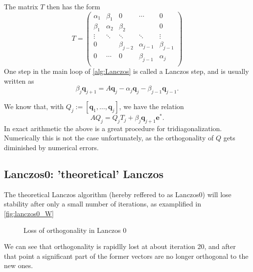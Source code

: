 \documentclass{article}
\begin{document}
	The matrix $T$ then has the form 
	$$T=\begin{pmatrix}
		\alpha_1&\beta_1&0&\cdots&0\\
		\beta_1&\alpha_2&\beta_2&&0\\
		\vdots&\ddots&\ddots&\ddots&\vdots\\
		0&&\beta_{j-2}&\alpha_{j-1}&\beta_{j-1}\\
		0&\cdots&0&\beta_{j-1}&\alpha_{j}\\
	\end{pmatrix}$$
	One step in the main loop of \autoref{alg:Lanczos} is called a Lanczos step, and is usually written as
	\begin{equation}\label{eq:LanczosStep}
		\beta_j\mathbf{q}_{j+1}=A\mathbf{q}_j-\alpha_j\mathbf{q}_j-\beta_{j-1}\mathbf{q}_{j-1}.
	\end{equation}
	
	We know that, with $Q_{j}:=[\mathbf{q}_1,\ldots,\mathbf{q}_j]$, we have the relation
	\begin{equation}\label{eq:matLanczos}
		AQ_{j}=Q_jT_j+\beta_{j}\mathbf{q}_{j+1}\mathbf{e}^{\ast}.
	\end{equation}
	In exact arithmetic the above is a great procedure for tridiagonalization. Numerically this is
	not the case unfortunately, as the orthogonality of $Q$ gets diminished by numerical errors.
	
	\subsection{Lanczos0: 'theoretical' Lanczos}
	
	The theoretical Lanczos algorithm (hereby reffered to as Lanczos0) will lose stability after only a small number of iterations, as examplified in \autoref{fig:lanczos0_W}
	\begin{figure}
		\centering
		\resizebox{\textwidth}{!}{
		}
		\caption{Loss of orthogonality in Lanczos 0}\label{fig:lanczos0_W}
	\end{figure}
	We can see that orthogonality is rapidlly lost at about iteration 20, and after that point a significant part of the former vectors are no longer orthogonal to the new ones.
	
\end{document}
